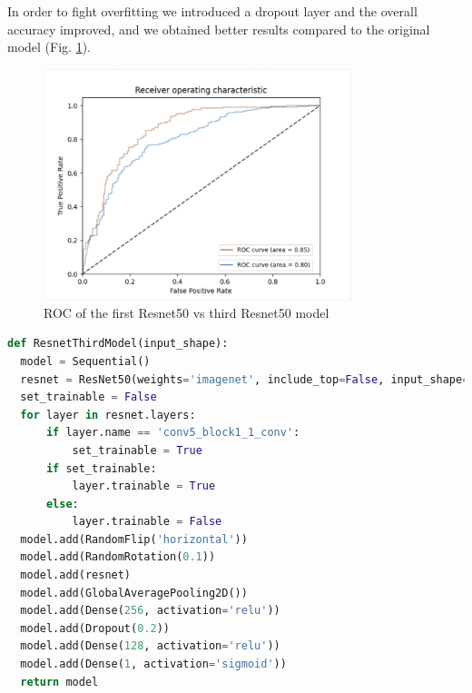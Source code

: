 In order to fight overfitting we introduced a dropout layer and the overall accuracy improved, and we obtained better results compared to the original model (Fig. \ref{fig:ROCResnet}). 
\begin{figure}[H]
    \centering
    \includegraphics[width=0.8\textwidth]{images/ROCResnet.png}
    \caption{ROC of the first Resnet50 vs third Resnet50 model}
    \label{fig:ROCResnet}
\end{figure}

\begin{lstlisting}[language=python, caption={ResNet50, third model code}, label={lst:resnet50CodeThirdTest}]
def ResnetThirdModel(input_shape):
  model = Sequential()
  resnet = ResNet50(weights='imagenet', include_top=False, input_shape=input_shape)
  set_trainable = False
  for layer in resnet.layers:
      if layer.name == 'conv5_block1_1_conv':
          set_trainable = True
      if set_trainable:
          layer.trainable = True
      else:
          layer.trainable = False
  model.add(RandomFlip('horizontal'))
  model.add(RandomRotation(0.1))
  model.add(resnet)
  model.add(GlobalAveragePooling2D())
  model.add(Dense(256, activation='relu'))
  model.add(Dropout(0.2))
  model.add(Dense(128, activation='relu'))
  model.add(Dense(1, activation='sigmoid'))
  return model
\end{lstlisting}



